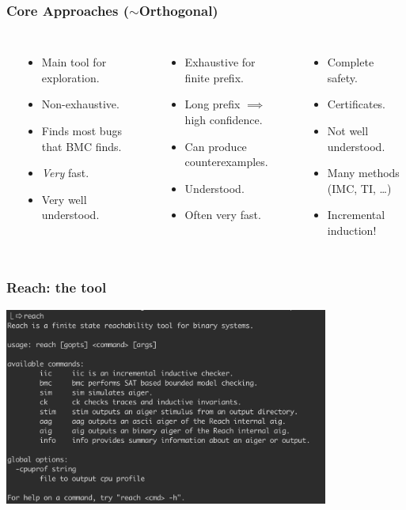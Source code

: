 \documentclass{beamer}
\begin{document}
\begin{frame}
	\frametitle{Core Approaches ($\sim$Orthogonal)}
	\begin{columns}
		\\


		\begin{itemize}
			\item Main tool for exploration.
			\item Non-exhaustive.
			\item Finds most bugs that BMC finds.
			\item {\em Very} fast.
			\item Very well understood.
		\end{itemize}

		\\
		\begin{itemize}
				\item Exhaustive for finite prefix.
				\item Long prefix $\implies$ high confidence.
				\item Can produce counterexamples.
				\item Understood.
				\item Often very fast.
		\end{itemize}

		\\
		\begin{itemize}
			\item Complete safety.
			\item Certificates.
			\item Not well understood.
			\item Many methods (IMC, TI, \ldots)
			\item Incremental induction!
		\end{itemize}

	\end{columns}
\end{frame}

\begin{frame}
	\frametitle{Reach: the tool}
	\begin{center}
	\includegraphics[width=0.8\textwidth]{reach.png}
	\end{center}
\end{frame}
\end{document}

